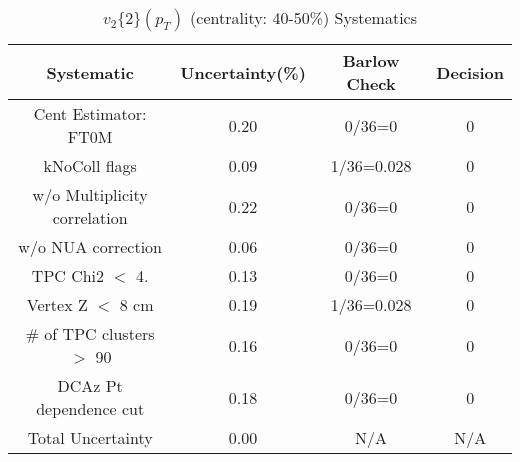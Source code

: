 \begin{table}[htbp]
\caption{$v_2\{2\}(p_{T})$ (centrality: 40-50\%) Systematics}
\label{tab:Sys_pTDiffv2}
\centering
\begin{tabular}{|c|c|c|c|}
\hline
Systematic & Uncertainty(\%) & Barlow Check & Decision \\
\hline
Cent Estimator: FT0M & 0.20 & 0/36=0 & 0 \\
kNoColl flags & 0.09 & 1/36=0.028 & 0 \\
w/o Multiplicity correlation & 0.22 & 0/36=0 & 0 \\
w/o NUA correction & 0.06 & 0/36=0 & 0 \\
TPC Chi2 $<$ 4. & 0.13 & 0/36=0 & 0 \\
Vertex Z $<$ 8 cm & 0.19 & 1/36=0.028 & 0 \\
\# of TPC clusters $>$ 90 & 0.16 & 0/36=0 & 0 \\
DCAz Pt dependence cut & 0.18 & 0/36=0 & 0 \\
\hline
Total Uncertainty & 0.00 & N/A & N/A \\
\hline
\end{tabular}
\end{table}
